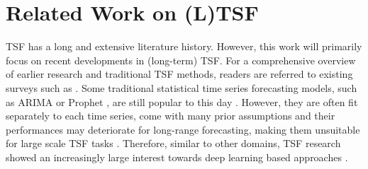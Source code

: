 \documentclass[a4paper,oneside,bibliography=totoc]{scrbook}
\begin{document}

\section{Related Work on (L)TSF}
\label{sec:related_work_LTSF}

TSF has a long and extensive literature history. However, this work will primarily focus on recent developments in (long-term) TSF.
For a comprehensive overview of earlier research and traditional TSF methods, readers are referred to existing surveys such as \citet{box_box_2013, box_time_2015, de_gooijer_25_2006, mahalakshmi_survey_2016, hamilton_time_1994}.
Some traditional statistical time series forecasting models, such as ARIMA \cite{box_distribution_1970} or Prophet \cite{taylor_forecasting_2018}, are still popular to this day \cite{long_forecasting_2023, ning_comparative_2022, albahli_lstm_2025}. 
However, they are often fit separately to each time series, come with many prior assumptions and their performances may deteriorate for long-range forecasting, making them unsuitable for large scale TSF tasks \cite{qin_dual-stage_2017, li_enhancing_2019}. 
Therefore, similar to other domains, TSF research showed an increasingly large interest towards deep learning based approaches \cite{benidis_deep_2022, hewamalage_recurrent_2021, lara-benitez_experimental_2021}. 
\newline
\end{document}
